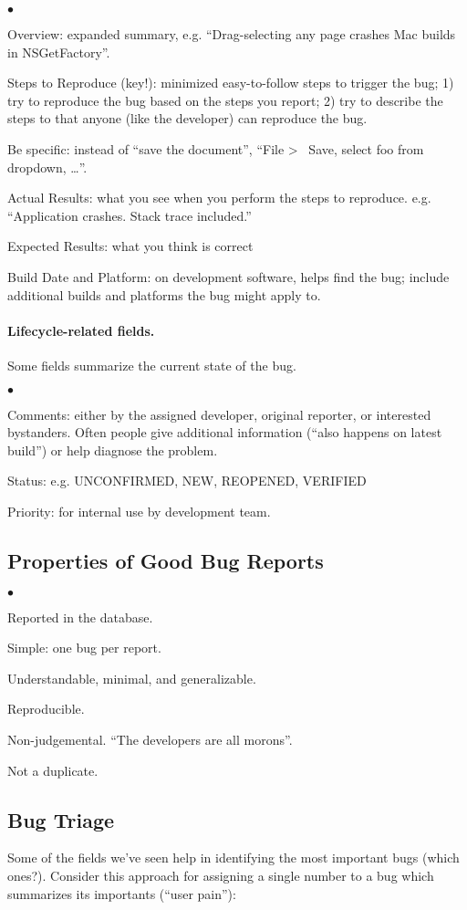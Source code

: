\documentclass[11pt]{article}
\newcommand{\squishlist}{
 \begin{list}{$\bullet$}
  { \setlength{\itemsep}{0pt}
     \setlength{\parsep}{3pt}
     \setlength{\topsep}{3pt}
     \setlength{\partopsep}{0pt}
     \setlength{\leftmargin}{1.5em}
     \setlength{\labelwidth}{1em}
     \setlength{\labelsep}{0.5em} } }
\newcommand{\squishend}{
  \end{list}  }
\begin{document}
\squishlist
\item Overview: expanded summary, e.g. ``Drag-selecting any page crashes 
Mac builds in NSGetFactory''.
\item Steps to Reproduce (key!): minimized easy-to-follow steps to trigger
the bug; 1) try to reproduce the bug based on the steps you report; 2)
try to describe the steps to that anyone (like the developer) can reproduce
the bug. 

Be specific: instead of ``save the document'', 
``File \textgreater~ Save, select foo from dropdown, \ldots''.
\item Actual Results: what you see when you perform the steps to reproduce.
e.g. ``Application crashes. Stack trace included.''
\item Expected Results: what you think is correct
\item Build Date and Platform: on development software, helps find the bug;
include additional builds and platforms the bug might apply to.
\squishend

\paragraph{Lifecycle-related fields.} Some fields summarize the
current state of the bug.
\squishlist
\item Comments: either by the assigned developer, original reporter, or
interested bystanders. Often people give additional information (``also happens
on latest build'') or help diagnose the problem.
\item Status: e.g. UNCONFIRMED, NEW, REOPENED, VERIFIED
\item Priority: for internal use by development team.
\squishend

\subsection*{Properties of Good Bug Reports}
\squishlist
\item Reported in the database.
\item Simple: one bug per report.
\item Understandable, minimal, and generalizable.
\item Reproducible.
\item Non-judgemental. ``The developers are all morons''.
\item Not a duplicate.
\squishend

\subsection*{Bug Triage}
Some of the fields we've seen help in identifying the most
important bugs (which ones?). Consider this approach for 
assigning a single number to a bug which summarizes its
importants (``user pain''):
\end{document}
